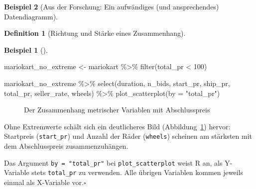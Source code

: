 \documentclass[
  a4paper,
]{scrbook}
\newenvironment{Shaded}{\begin{snugshade}}{\end{snugshade}}
\newcommand{\AttributeTok}[1]{\textcolor[rgb]{0.40,0.45,0.13}{#1}}
\newcommand{\DecValTok}[1]{\textcolor[rgb]{0.68,0.00,0.00}{#1}}
\newcommand{\FunctionTok}[1]{\textcolor[rgb]{0.28,0.35,0.67}{#1}}
\newcommand{\NormalTok}[1]{\textcolor[rgb]{0.00,0.23,0.31}{#1}}
\newcommand{\OtherTok}[1]{\textcolor[rgb]{0.00,0.23,0.31}{#1}}
\newcommand{\SpecialCharTok}[1]{\textcolor[rgb]{0.37,0.37,0.37}{#1}}
\newcommand{\StringTok}[1]{\textcolor[rgb]{0.13,0.47,0.30}{#1}}
\theoremstyle{definition}
\newtheorem{example}{Beispiel}[chapter]
\theoremstyle{definition}
\newtheorem{definition}{Definition}[chapter]
\theoremstyle{definition}
\theoremstyle{remark}
\begin{document}
\begin{example}[Aus der Forschung: Ein aufwändiges (und ansprechendes)
Datendiagramm]
\begin{definition}[Richtung und Stärke eines
Zusammenhang]
\begin{example}[]
\begin{Shaded}
\begin{Highlighting}[]
\NormalTok{mariokart\_no\_extreme }\OtherTok{\textless{}{-}}
\NormalTok{  mariokart }\SpecialCharTok{\%\textgreater{}\%} 
  \FunctionTok{filter}\NormalTok{(total\_pr }\SpecialCharTok{\textless{}} \DecValTok{100}\NormalTok{)}

\NormalTok{mariokart\_no\_extreme }\SpecialCharTok{\%\textgreater{}\%} 
  \FunctionTok{select}\NormalTok{(duration, n\_bids, start\_pr, }
\NormalTok{         ship\_pr, total\_pr, }
\NormalTok{         seller\_rate, wheels) }\SpecialCharTok{\%\textgreater{}\%} 
  \FunctionTok{plot\_scatterplot}\NormalTok{(}\AttributeTok{by =} \StringTok{"total\_pr"}\NormalTok{)}
\end{Highlighting}
\end{Shaded}

\begin{figure}[H]


\caption{\label{fig-mario-scatter2}Der Zusammenhang metrischer Variablen
mit Abschlusspreis}

\end{figure}%

Ohne Extremwerte schält sich ein deutlicheres Bild
(Abbildung~\ref{fig-mario-scatter2}) hervor: Startpreis
(\texttt{start\_pr}) und Anzahl der Räder (\texttt{wheels}) scheinen am
stärksten mit dem Abschlusspreis zusammenzuhängen.

Das Argument \texttt{by\ =\ "total\_pr"} bei \texttt{plot\_scatterplot}
weist R an, als Y-Variable stets \texttt{total\_pr} zu verwenden. Alle
übrigen Variablen kommen jeweils einmal als X-Variable vor.\(\square\)


\end{example}
\end{definition}
\end{example}
\end{document}

